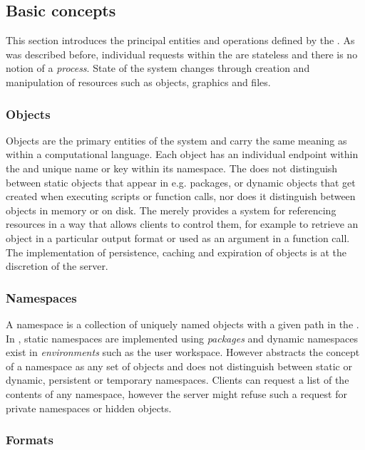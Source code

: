 \subsection{Basic concepts}

This section introduces the principal entities and operations defined by the \API. As was described before, individual requests within the \OpenCPU \API are stateless and there is no notion of a \emph{process}. State of the system changes through creation and manipulation of resources such as objects, graphics and files. 

\subsubsection{Objects}

Objects are the primary entities of the system and carry the same meaning as within a computational language. Each object has an individual endpoint within the \API and unique name or key within its namespace. The \API does not distinguish between static objects that appear in e.g. packages, or dynamic objects that get created when executing scripts or function calls, nor does it distinguish between objects in memory or on disk. The \API merely provides a system for referencing resources in a way that allows clients to control them, for example to retrieve an object in a particular output format or used as an argument in a function call. The implementation of persistence, caching and expiration of objects is at the discretion of the server. 

\subsubsection{Namespaces}

A namespace is a collection of uniquely named objects with a given path in the \API. In \R, static namespaces are implemented using \emph{packages} and dynamic namespaces exist in \emph{environments} such as the user workspace. However \OpenCPU abstracts the concept of a namespace as any set of objects and does not distinguish between static or dynamic, persistent or temporary namespaces. Clients can request a list of the contents of any namespace, however the server might refuse such a request for private namespaces or hidden objects. 

\subsubsection{Formats}

